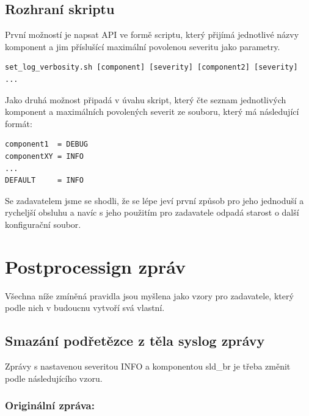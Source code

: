 \documentclass[thesis=B,czech]{FITthesis}[2012/06/26]
\begin{document}
\subsection{Rozhraní skriptu}
První možností je napsat API ve formě scriptu, který přijímá jednotlivé názvy komponent a jim příslušící maximální povolenou severitu jako parametry.
\begin{scriptsize}
\begin{verbatim}
set_log_verbosity.sh [component] [severity] [component2] [severity] ...
\end{verbatim}
\end{scriptsize}

Jako druhá možnost připadá v úvahu skript, který čte seznam jednotlivých komponent a maximálních povolených severit ze souboru, který má následující formát:

\begin{scriptsize}
\begin{verbatim}
/etc/logging.conf
\end{verbatim}}
\end{scriptsize}

\begin{scriptsize}
\begin{verbatim}
component1  = DEBUG
componentXY = INFO
...
DEFAULT     = INFO
\end{verbatim}
\end{scriptsize}

Se zadavatelem jsme se shodli, že se lépe jeví první způsob pro jeho jednoduší a rycheljší obsluhu a navíc s jeho použitím pro zadavatele odpadá starost o další konfigurační soubor.

\section{Postprocessign zpráv}
Všechna níže zmíněná pravidla jsou myšlena jako vzory pro zadavatele, který podle nich v budoucnu vytvoří svá vlastní.
\subsection{Smazání podřetězce z těla syslog zprávy}
Zprávy s nastavenou severitou INFO a komponentou sld\_br je třeba změnit podle následujícího vzoru.

\subsubsection*{Originální zpráva:}
\begin{scriptsize}
\begin{verbatim}
2016-02-18T14:05:24+01:00 cc-b8-f1-00-6f-07 sld_br: id=559 
:[stbhal.cpp:debug:520]: INFO: [94mDEBUG: InformationService:
 Reading 'nangu.video.forcedScart': false[0m
\end{verbatim}}
\end{scriptsize}
\end{document}
